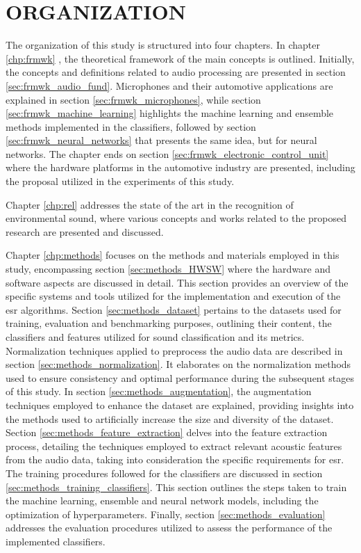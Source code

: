 \section{ORGANIZATION}
\label{sec:introduction_organization}

The organization of this study is structured into four chapters. In chapter \ref{chp:frmwk} , the theoretical framework of the main concepts is outlined. Initially, the concepts and definitions related to audio processing are presented in section \ref{sec:frmwk_audio_fund}. Microphones and their automotive applications are explained in section \ref{sec:frmwk_microphones}, while section \ref{sec:frmwk_machine_learning} highlights the machine learning and ensemble methods implemented in the classifiers, followed by section \ref{sec:frmwk_neural_networks} that presents the same idea, but for neural networks. The chapter ends on section \ref{sec:frmwk_electronic_control_unit} where the hardware platforms in the automotive industry are presented, including the proposal utilized in the experiments of this study.

Chapter \ref{chp:rel} addresses the state of the art in the recognition of environmental sound, where various concepts and works related to the proposed research are presented and discussed.

Chapter \ref{chp:methods} focuses on the methods and materials employed in this study, encompassing section \ref{sec:methods_HWSW} where the hardware and software aspects are discussed in detail. This section provides an overview of the specific systems and tools utilized for the implementation and execution of the \gls{esr} algorithms. Section \ref{sec:methods_dataset} pertains to the datasets used for training, evaluation and benchmarking purposes, outlining their content, the classifiers and features utilized for sound classification and its metrics. Normalization techniques applied to preprocess the audio data are described in section \ref{sec:methods_normalization}. It elaborates on the normalization methods used to ensure consistency and optimal performance during the subsequent stages of this study. In section \ref{sec:methods_augmentation}, the augmentation techniques employed to enhance the dataset are explained, providing insights into the methods used to artificially increase the size and diversity of the dataset. Section \ref{sec:methods_feature_extraction} delves into the feature extraction process, detailing the techniques employed to extract relevant acoustic features from the audio data, taking into consideration the specific requirements for \gls{esr}. The training procedures followed for the classifiers are discussed in section \ref{sec:methods_training_classifiers}. This section outlines the steps taken to train the machine learning, ensemble and neural network models, including the optimization of hyperparameters. Finally, section \ref{sec:methods_evaluation} addresses the evaluation procedures utilized to assess the performance of the implemented classifiers.

